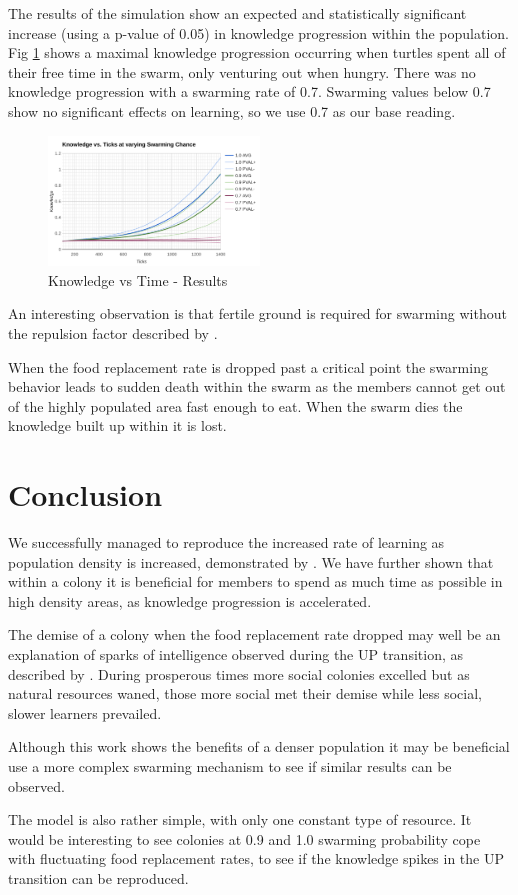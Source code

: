 \documentclass[a4paper,12pt,twocolumn]{report}
\begin{document}
The results of the simulation show an expected and statistically significant increase (using a p-value of 0.05) in knowledge progression within the population. Fig \ref{fig:table} shows a maximal knowledge progression occurring when turtles spent all of their free time in the swarm, only venturing out when hungry. There was no knowledge progression with a swarming rate of 0.7. Swarming values below 0.7 show no significant effects on learning, so we use 0.7 as our base reading.

\begin{figure}[b]
 \includegraphics[width=0.5\textwidth]{swarming-effect}
 \caption{Knowledge vs Time - Results}
 \label{fig:table}
\end{figure}

An interesting observation is that fertile ground is required for swarming without the repulsion factor described by \cite{agueh2011analysis}.

When the food replacement rate is dropped past a critical point the swarming behavior leads to sudden death within the swarm as the members cannot get out of the highly populated area fast enough to eat. When the swarm dies the knowledge built up within it is lost.

\section{Conclusion}

We successfully managed to reproduce the increased rate of learning as population density is increased, demonstrated by \cite{powell2009late}. We have further shown that within a colony it is beneficial for members to spend as much time as possible in high density areas, as knowledge progression is accelerated.

The demise of a colony when the food replacement rate dropped may well be an explanation of sparks of intelligence observed during the UP transition, as described by \cite{powell2009late}. During prosperous times more social colonies excelled but as natural resources waned, those more social met their demise while less social, slower learners prevailed.

Although this work shows the benefits of a denser population it may be beneficial use a more complex swarming mechanism to see if similar results can be observed.

The model is also rather simple, with only one constant type of resource. It would be interesting to see colonies at 0.9 and 1.0 swarming probability cope with fluctuating food replacement rates, to see if the knowledge spikes in the UP transition can be reproduced. 


\end{document}
